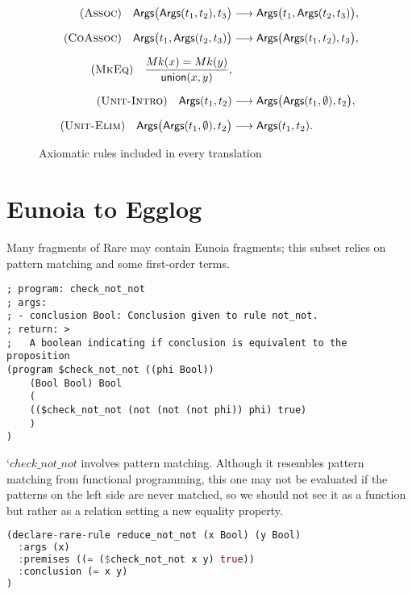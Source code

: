 \documentclass{article}
\begin{document}
\begin{figure}
\centering
\begin{align*}
  (\textsc{Assoc})\quad
  \mathsf{Args}\bigl(\mathsf{Args}(t_{1},t_{2}),t_{3}\bigr)
  &\longrightarrow
  \mathsf{Args}\bigl(t_{1},\mathsf{Args}(t_{2},t_{3})\bigr),\\[6pt]
  (\textsc{CoAssoc})\quad
  \mathsf{Args}\bigl(t_{1},\mathsf{Args}(t_{2},t_{3})\bigr)
  &\longrightarrow
  \mathsf{Args}\bigl(\mathsf{Args}(t_{1},t_{2}),t_{3}\bigr),\\[6pt]
  (\textsc{MkEq})\quad
  \frac{Mk(x)=Mk(y)}{\mathsf{union}(x,y)},\\[6pt]
  (\textsc{Unit-Intro})\quad
  \mathsf{Args}(t_{1},t_{2})
  &\longrightarrow
  \mathsf{Args}\bigl(\mathsf{Args}(t_{1},\emptyset),t_{2}\bigr),\\[6pt]
  (\textsc{Unit-Elim})\quad
  \mathsf{Args}\bigl(\mathsf{Args}(t_{1},\emptyset),t_{2}\bigr)
  &\longrightarrow
  \mathsf{Args}(t_{1},t_{2}).
\end{align*}
\caption{Axiomatic rules included in every translation}
\label{fig:fig4}
\end{figure}

\section{Eunoia to Egglog}
Many fragments of Rare may contain Eunoia fragments; this subset relies on pattern matching and some first-order terms.

\begin{lstlisting}
; program: check_not_not
; args:
; - conclusion Bool: Conclusion given to rule not_not.
; return: >
;   A boolean indicating if conclusion is equivalent to the proposition
(program $check_not_not ((phi Bool))
    (Bool Bool) Bool
    (
    (($check_not_not (not (not (not phi)) phi) true)
    )
)
\end{lstlisting}

`$check\_not\_not$ involves pattern matching. Although it resembles pattern matching from functional programming, this one may not be evaluated if the patterns on the left side are never matched, so we should not see it as a function but rather as a relation setting a new equality property.

\begin{lstlisting}[language=Rust]
(declare-rare-rule reduce_not_not (x Bool) (y Bool)
  :args (x)
  :premises ((= ($check_not_not x y) true))
  :conclusion (= x y)
)
\end{lstlisting}
\end{document}

